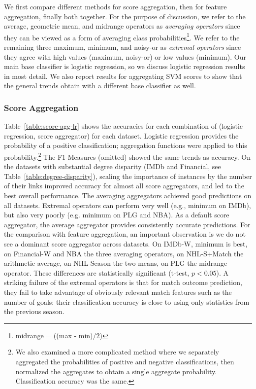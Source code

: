 \documentclass[conference]{IEEEtran}
\begin{document}
We first compare different methods for score aggregation, then for feature aggregation, finally both together. For the purpose of discussion, we refer to the average, geometric mean, and midrange operators as {\em averaging operators} since they can be viewed as a form of averaging class probabilities\footnote{midrange = ((max - min)/2)}. We refer to the remaining three maximum, minimum, and noisy-or as {\em extremal operators} since they agree with high values (maximum, noisy-or) or low values (minimum). Our main base classifier is logistic regression, so we discuss logistic regression results in most detail. We also report results for aggregating SVM scores to show that the general trends obtain with a different base classifier as well.

\subsubsection{Score Aggregation} Table~\ref{table:score-agg-lr} shows the accuracies for each combination of (logistic regression, score aggregator) for each dataset. Logistic regression provides the probability of a positive classification; aggregation functions were applied to this probability.\footnote{We also examined a more complicated method where we separately aggregated the probabilities of positive and negative classifications, then normalized the aggregates to obtain a single aggregate probability. Classification accuracy was the same.} The F1-Measures (omitted) showed the same trends as accuracy. On the datasets with substantial degree disparity (IMDb and Financial, see Table~\ref{table:degree-disparity}), scaling the importance of instances by the number of their links improved accuracy for almost all score aggregators, and led to the best overall performance. The averaging aggregators achieved good predictions on all datasets. Extremal operators can perform very well (e.g., minimum on IMDb), but also very poorly (e.g. minimum on PLG and NBA). As a default score aggregator, the average aggregator provides consistently accurate predictions. For the comparison with feature aggregation, an important observation is we do not see a dominant score aggregator across datasets. On IMDb-W, minimum is best, on Financial-W and NBA the three averaging operators, on NHL-S+Match the arithmetic average, on NHL-Season the two means, on PLG the midrange operator. These differences are statistically significant (t-test, $p<0.05$). A striking failure of the extremal operators is that for match outcome prediction, they fail to take advantage of obviously relevant match features such as the number of goals: their classification accuracy is close to using only statistics from the previous season.
\end{document}
